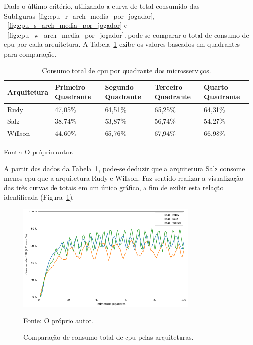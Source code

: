 Dado o último critério, utilizando a curva de total consumido das Subfiguras~\ref{fig:cpu_r_arch_media_por_jogador}, ~\ref{fig:cpu_s_arch_media_por_jogador} e ~\ref{fig:cpu_w_arch_media_por_jogador},  pode-se comparar o total de consumo de \ac{cpu} por cada arquitetura.
%
A Tabela~\ref{tab:consumo_total_cpu} exibe os valores baseados em quadrantes para comparação.

\vspace{-0.3cm}
\begin{table}[htb!]
\centering
\begin{adjustbox}{max width=\textwidth}
\caption{Consumo total de \ac{cpu} por quadrante dos microsserviços.}
\label{tab:consumo_total_cpu}
\vspace{-0.3cm}
\begin{tabular}{l|l|l|l|l}
\hline \hline
Arquitetura & Primeiro Quadrante & Segundo Quadrante & Terceiro Quadrante & Quarto Quadrante \\ \hline \hline
Rudy        & 47,05\%            & 64,51\%           & 65,25\%            & 64,31\%          \\ \hline
Salz        & 38,74\%            & 53,87\%           & 56,74\%            & 54,27\%          \\ \hline
Willson     & 44,60\%            & 65,76\%           & 67,94\%            & 66,98\%          \\ \hline \hline
\end{tabular}
\end{adjustbox}

Fonte: O próprio autor.
\end{table}

\vspace{-0.3cm}
A partir dos dados da Tabela~\ref{tab:consumo_total_cpu}, pode-se deduzir que a arquitetura Salz consome menos \ac{cpu} que a arquitetura Rudy e Willson.
%
Faz sentido realizar a visualização das três curvas de totais em um único gráfico, a fim de exibir esta relação identificada (Figura~\ref{fig:consumo_total_cpu}).

\vspace{-0.3cm}
\begin{figure}[htb!]
  \caption{Comparação de consumo total de \ac{cpu} pelas arquiteturas.}
  \vspace{-0.5cm}
  \label{fig:consumo_total_cpu}
  \includegraphics[width=0.8\textwidth]{figuras/analise/cpu_total_archs.png}
  \centering

  \vspace{-0.3cm}
  Fonte: O próprio autor.
\end{figure}

